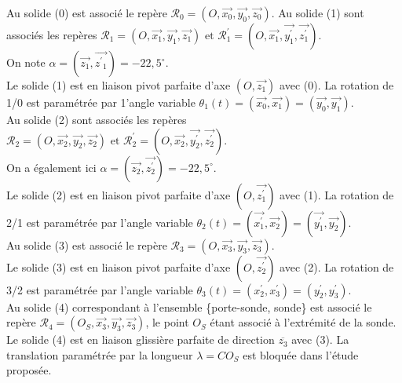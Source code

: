 
Au solide (0) est associé le repère $\mathcal{R}_{0}=\left(O, \overrightarrow{x_{0}}, \overrightarrow{y_{0}}, \overrightarrow{z_{0}}\right)$. Au solide (1) sont associés les repères \( \mathcal{R}_{1}=\left(O, \overrightarrow{x_{1}}, \overrightarrow{y_{1}}, \overrightarrow{z_{1}}\right) \text { et } \mathcal{R}_{1}^{\prime}=\left(O, \overrightarrow{x_{1}}, \overrightarrow{y_{1}^{\prime}}, \overrightarrow{z_{1}^{\prime}}\right) . \) \\
On note $\alpha=\left(\overrightarrow{z_{1}}, \overrightarrow{z^{\prime}{ }_{1}}\right)=-22,5^{\circ}$. \\
Le solide (1) est en liaison pivot parfaite d'axe $\left(O, \overrightarrow{z_{1}}\right)$ avec (0). La rotation de 1/0 est paramétrée par 1'angle variable $\theta_{1}(t)=\left(\overrightarrow{x_{0}}, \overrightarrow{x_{1}}\right)=\left(\overrightarrow{y_{0}}, \overrightarrow{y_{1}}\right)$. \\
Au solide (2) sont associés les repères \( \mathcal{R}_{2}=\left(O, \overrightarrow{x_{2}}, \overrightarrow{y_{2}}, \overrightarrow{z_{2}}\right) \text { et } \mathcal{R}_{2}^{\prime}=\left(O, \overrightarrow{x_{2}}, \overrightarrow{y_{2}^{\prime}}, \overrightarrow{z_{2}^{\prime}}\right) . \) \\
On a également ici $\alpha=\left(\overrightarrow{z_{2}}, \overrightarrow{z_{2}^{\prime}}\right)=-22,5^{\circ}$. \\
Le solide (2) est en liaison pivot parfaite d'axe $\left(O, \overrightarrow{z_{1}^{\prime}}\right)$ avec (1). La rotation de 2/1 est paramétrée par l'angle variable $\theta_{2}(t)=\left(\overrightarrow{x_{1}^{\prime}}, \overrightarrow{x_{2}}\right)=\left(\overrightarrow{y_{1}^{\prime}}, \overrightarrow{y_{2}}\right)$. \\
Au solide (3) est associé le repère $\mathcal{R}_{3}=\left(O, \overrightarrow{x_{3}}, \overrightarrow{y_{3}}, \overrightarrow{z_{3}}\right)$. \\
Le solide (3) est en liaison pivot parfaite d'axe $\left(O, \overrightarrow{z_{2}^{\prime}}\right)$ avec (2). La rotation de 3/2 est paramétrée par l'angle variable $\theta_{3}(t)=\left(x_{2}^{\prime}, x_{3}^{\prime}\right)=\left(y_{2}^{\prime}, y_{3}^{\prime}\right)$. \\
Au solide (4) correspondant à l'ensemble \{porte-sonde, sonde\} est associé le repère $\mathcal{R}_{4}=\left(O_{S}, \overrightarrow{x_{3}}, \overrightarrow{y_{3}}, \overrightarrow{z_{3}}\right)$, le point $O_{S}$ étant associé à l'extrémité de la sonde. Le solide (4) est en liaison glissière parfaite de direction $\overline{z_{3}}$ avec (3). La translation paramétrée par la longueur $\lambda=C O_{S}$ est bloquée dans l'étude proposée. \\
